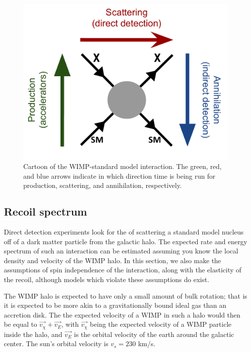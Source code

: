 \begin{figure}[h!]
\centering
\includegraphics[width=150mm]{Figures/WIMP_interaction.pdf}
\caption{Cartoon of the WIMP-standard model interaction. The green, red, and blue arrows indicate in which direction time is being run for production, scattering, and annihilation, respectively.}
\label{fig:WIMP_SM} 
\end{figure}

\subsection{Recoil spectrum}
Direct detection experiments look for the of scattering a standard model nucleus off of a dark matter particle from the galactic halo. The expected rate and energy spectrum of such an interaction can be estimated assuming you know the local density and velocity of the WIMP halo. In this section, we also make the assumptions of spin independence of the interaction, along with the elasticity of the recoil, although models which violate these assumptions do exist.

The WIMP halo is expected to have only a small amount of bulk rotation; that is it is expected to be more akin to a gravitationally bound ideal gas than an accretion disk. The the expected velocity of a WIMP in such a halo would then be equal to $\vec{v_{\chi}}+\vec{v_E}$, with $\vec{v_{\chi}}$ being the expected velocity of a WIMP particle inside the halo, and $\vec{v_E}$ is the orbital velocity of the earth around the galactic center. The sun's orbital velocity is $v_s=230$ km/s.

